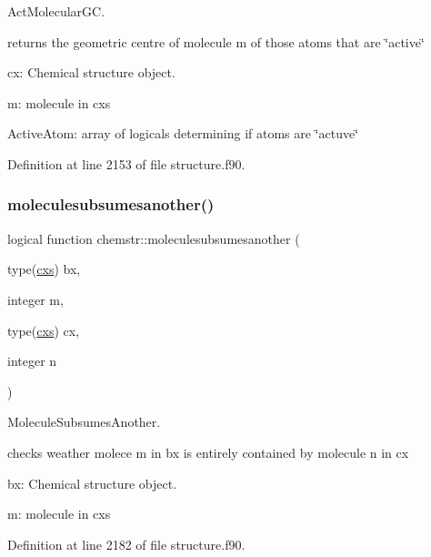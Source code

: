 Act\+Molecular\+GC. 

returns the geometric centre of molecule m of those atoms that are \char`\"{}active\char`\"{}


\begin{DoxyItemize}
\item cx\+: Chemical structure object.
\item m\+: molecule in cxs
\item Active\+Atom\+: array of logicals determining if atoms are \char`\"{}actuve\char`\"{} 
\end{DoxyItemize}

Definition at line 2153 of file structure.\+f90.

\mbox{\label{namespacechemstr_abc7f8acc3a6b5cc02df929173e6f1731}} 
\subsubsection{\texorpdfstring{moleculesubsumesanother()}{moleculesubsumesanother()}}
{\footnotesize\ttfamily logical function chemstr\+::moleculesubsumesanother (\begin{DoxyParamCaption}\item[{type(\mbox{\hyperlink{structchemstr_1_1cxs}{cxs}})}]{bx,  }\item[{integer}]{m,  }\item[{type(\mbox{\hyperlink{structchemstr_1_1cxs}{cxs}})}]{cx,  }\item[{integer}]{n }\end{DoxyParamCaption})}



Molecule\+Subsumes\+Another. 

checks weather molece m in bx is entirely contained by molecule n in cx


\begin{DoxyItemize}
\item bx\+: Chemical structure object.
\item m\+: molecule in cxs 
\end{DoxyItemize}

Definition at line 2182 of file structure.\+f90.

\mbox{\label{namespacechemstr_afc5628a255fd4d03fa2e587ce60b371f}} 
